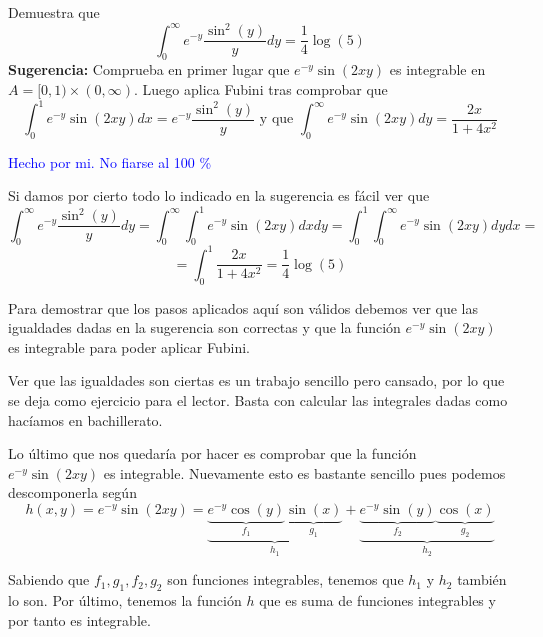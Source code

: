 \begin{problem}[5]
Demuestra que
\[\int_0^{\infty}e^{-y}\frac{\sin^2(y)}{y}dy=\frac{1}{4}\log(5)\]
\textbf{Sugerencia:} Comprueba en primer lugar que $e^{-y}\sin(2xy)$ es integrable en $A=[0,1)\times(0,\infty)$. Luego aplica Fubini tras comprobar que
\[\int_0^1e^{-y}\sin(2xy)dx=e^{-y}\frac{\sin^2(y)}{y} \text{ y que } \int_0^{\infty}e^{-y}\sin(2xy)dy = \frac{2x}{1+4x^2}\]

\solution
\textcolor{blue}{Hecho por mi. No fiarse al 100 \%}

Si damos por cierto todo lo indicado en la sugerencia es fácil ver que
\[\int_0^{\infty}e^{-y}\frac{\sin^2(y)}{y}dy = \int_0^{\infty}\int_0^1e^{-y}\sin(2xy)dxdy = \int_0^1\int_0^{\infty}e^{-y}\sin(2xy)dydx = \]
\[=\int_0^1\frac{2x}{1+4x^2} =\frac{1}{4}\log(5)\]

Para demostrar que los pasos aplicados aquí son válidos debemos ver que las igualdades dadas en la sugerencia son correctas y que la función $e^{-y}\sin(2xy)$ es integrable para poder aplicar Fubini.

Ver que las igualdades son ciertas es un trabajo sencillo pero cansado, por lo que se deja como ejercicio para el lector. Basta con calcular las integrales dadas como hacíamos en bachillerato.

Lo último que nos quedaría por hacer es comprobar que la función $e^{-y}\sin(2xy)$ es integrable. Nuevamente esto es bastante sencillo pues podemos descomponerla según
\[h(x,y)=e^{-y}\sin(2xy)=\underbrace{\underbrace{e^{-y}\cos(y)}_{f_1}\underbrace{\sin(x)}_{g_1}}_{h_1}+\underbrace{\underbrace{e^{-y}\sin(y)}_{f_2}\underbrace{\cos(x)}_{g_2}}_{h_2}\]

Sabiendo que $f_1,g_1,f_2,g_2$ son funciones integrables, tenemos que $h_1$ y $h_2$ también lo son. Por último, tenemos la función $h$ que es suma de funciones integrables y por tanto es integrable.
\end{problem}